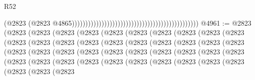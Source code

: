 \begin{lexlean}{R52}
\begin{coremodule}
                                                                                              (@2823
                                                                                                (@2823
                                                                                                  @4865)))))))))))))))))))))))))))))))))))))))))))))))
@4961 := @2823
    (@2823
      (@2823
        (@2823
          (@2823
            (@2823
              (@2823
                (@2823
                  (@2823
                    (@2823
                      (@2823
                        (@2823
                          (@2823
                            (@2823
                              (@2823
                                (@2823
                                  (@2823
                                    (@2823
                                      (@2823
                                        (@2823
                                          (@2823
                                            (@2823
                                              (@2823
                                                (@2823
                                                  (@2823
                                                    (@2823
                                                      (@2823
                                                        (@2823
                                                          (@2823
                                                            (@2823
                                                              (@2823
                                                                (@2823
                                                                  (@2823
                                                                    (@2823
                                                                      (@2823
                                                                        (@2823
                                                                          (@2823
                                                                            (@2823
                                                                              (@2823
                                                                                (@2823
                                                                                  (@2823
                                                                                    (@2823
                                                                                      (@2823
                                                                                        (@2823

\end{coremodule}
\end{lexlean}
